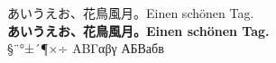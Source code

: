\documentclass[landscape]{tarticle}
\begin{document}
\parindent0mm
\pagestyle{empty}
あいうえお、花鳥風月。Einen schönen Tag.\\
{\bfseries あいうえお、花鳥風月。Einen schönen Tag.}\\
§¨°±´¶×÷ ΑΒΓαβγ АБВабв
\end{document}
